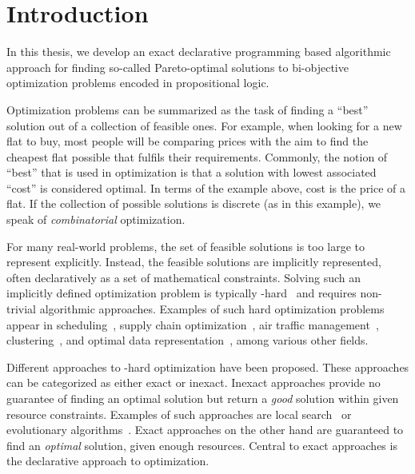 \chapter{Introduction\label{chap:intro}}

In this thesis, we develop an exact declarative programming based algorithmic approach for finding so-called Pareto-optimal solutions to bi-objective optimization problems encoded in propositional logic.

Optimization problems can be summarized as the task of finding a ``best'' solution out of a collection of feasible ones.
For example, when looking for a new flat to buy, most people will be comparing prices with the aim to find the cheapest flat possible that fulfils their requirements.
Commonly, the notion of ``best'' that is used in optimization is that a solution with lowest associated ``cost'' is considered optimal.
In terms of the example above, cost is the price of a flat.
If the collection of possible solutions is discrete (as in this example), we speak of \emph{combinatorial} optimization.

For many real-world problems, the set of feasible solutions is too large to represent explicitly.
Instead, the feasible solutions are implicitly represented, often declaratively as a set of mathematical constraints.
Solving such an implicitly defined optimization problem is typically \NP-hard~\autocite{AroraBarak2009-complexity} and requires non-trivial algorithmic approaches.
Examples of such hard optimization problems appear in scheduling~\autocites{DBLP:conf/cp/Stojadinovic14,DBLP:conf/cpaior/BofillGSV15,DBLP:journals/ior/Solomon87,DBLP:journals/candie/AkyolB07}, supply chain optimization~\autocite{DBLP:journals/cce/Papageorgiou09}, air traffic management~\autocites{DBLP:journals/ior/BertsimasLO11,RichardsHow2002Aircrafttrajectoryplanning}, clustering~\autocite{DBLP:journals/ai/DaoDV17,DBLP:conf/sdm/DavidsonRS10}, and optimal data representation~\autocites{DBLP:conf/cp/MaliotovM18,DBLP:conf/ijcai/NarodytskaIPM18,DBLP:conf/ijcai/Hu0HH20,DBLP:conf/cp/YuISB20,DBLP:conf/aaai/DemirovicS21,DBLP:conf/cp/ShatiCM21,DBLP:conf/cade/IgnatievPNM18}, among various other fields.

Different approaches to \NP-hard optimization have been proposed.
These approaches can be categorized as either exact or inexact.
Inexact approaches provide no guarantee of finding an optimal solution but return a \emph{good} solution within given resource constraints.
Examples of such approaches are local search~\autocite{DBLP:books/daglib/0017492} or evolutionary algorithms~\autocite{DBLP:books/daglib/0087893,DBLP:journals/jgo/StornP97}.
Exact approaches on the other hand are guaranteed to find an \emph{optimal} solution, given enough resources.
Central to exact approaches is the declarative approach to optimization.

